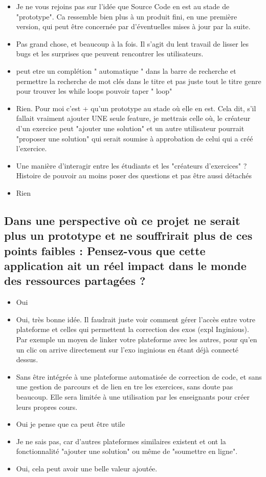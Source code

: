 \begin{itemize}
    \item Je ne vous rejoins pas sur l'idée que Source Code en est au stade de "prototype". Ca ressemble bien plus à un produit fini, en une première version, qui peut être concernée par d'éventuelles mises à jour par la suite.
    \item Pas grand chose, et beaucoup à la fois. Il s'agit du lent travail de lisser les bugs et les surprises que peuvent rencontrer les utilisateurs.
    \item peut etre un complétion " automatique " dans la barre de recherche et permettre la recherche de mot clés dans le titre et pas juste tout le titre genre pour trouver les while loops pouvoir taper " loop"
    \item Rien. Pour moi c'est + qu'un prototype au stade où elle en est. Cela dit, s'il fallait vraiment ajouter UNE seule feature, je mettrais celle où, le créateur d'un exercice peut "ajouter une solution" et un autre utilisateur pourrait "proposer une solution" qui serait soumise à approbation de celui qui a créé l'exercice.
    \item Une manière d'interagir entre les étudiants et les "créateurs d'exercices" ? Histoire de pouvoir au moins poser des questions et pas être aussi détachés
    \item Rien
\end{itemize}

\subsection*{Dans une perspective où ce projet ne serait plus un prototype et ne souffrirait plus de ces points faibles : Pensez-vous que cette application ait un réel impact dans le monde des ressources partagées ?}

\begin{itemize}
    \item Oui
    \item Oui, très bonne idée. Il faudrait juste voir comment gérer l'accès entre votre plateforme et celles qui permettent la correction des exos (expl Inginious). Par exemple un moyen de linker votre plateforme avec les autres, pour qu'en un clic on arrive directement sur l'exo inginious en étant déjà connecté dessus.
    \item Sans être intégrée à une plateforme automatisée de correction de code, et sans une gestion de parcours et de lien en tre les exercices, sans doute pas beaucoup. Elle sera limitée à une utilisation par les enseignants pour créer leurs propres cours.
    \item Oui je pense que ca peut être utile
    \item Je ne sais pas, car d'autres plateformes similaires existent et ont la fonctionnalité "ajouter une solution" ou même de "soumettre en ligne".
    \item Oui, cela peut avoir une belle valeur ajoutée.
\end{itemize}

